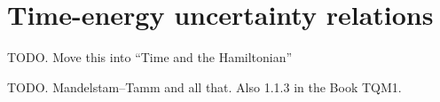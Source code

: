 \section{Time-energy uncertainty relations}

TODO. Move this into ``Time and the Hamiltonian''

TODO. Mandelstam--Tamm and all that. Also 1.1.3 in the Book TQM1.